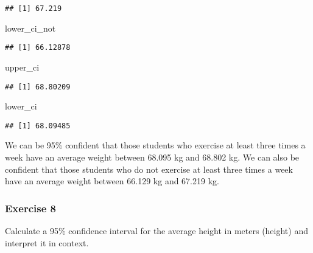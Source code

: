 \documentclass[
]{article}
\newenvironment{Shaded}{\begin{snugshade}}{\end{snugshade}}
\newcommand{\NormalTok}[1]{#1}
\begin{document}
\begin{verbatim}
## [1] 67.219
\end{verbatim}

\begin{Shaded}
\begin{Highlighting}[]
\NormalTok{lower_ci_not}
\end{Highlighting}
\end{Shaded}

\begin{verbatim}
## [1] 66.12878
\end{verbatim}

\begin{Shaded}
\begin{Highlighting}[]
\NormalTok{upper_ci}
\end{Highlighting}
\end{Shaded}

\begin{verbatim}
## [1] 68.80209
\end{verbatim}

\begin{Shaded}
\begin{Highlighting}[]
\NormalTok{lower_ci}
\end{Highlighting}
\end{Shaded}

\begin{verbatim}
## [1] 68.09485
\end{verbatim}

We can be 95\% confident that those students who exercise at least three
times a week have an average weight between 68.095 kg and 68.802 kg. We
can also be confident that those students who do not exercise at least
three times a week have an average weight between 66.129 kg and 67.219
kg.

\hypertarget{exercise-8}{%
\subsubsection{Exercise 8}\label{exercise-8}}

Calculate a 95\% confidence interval for the average height in meters
(height) and interpret it in context.
\end{document}
